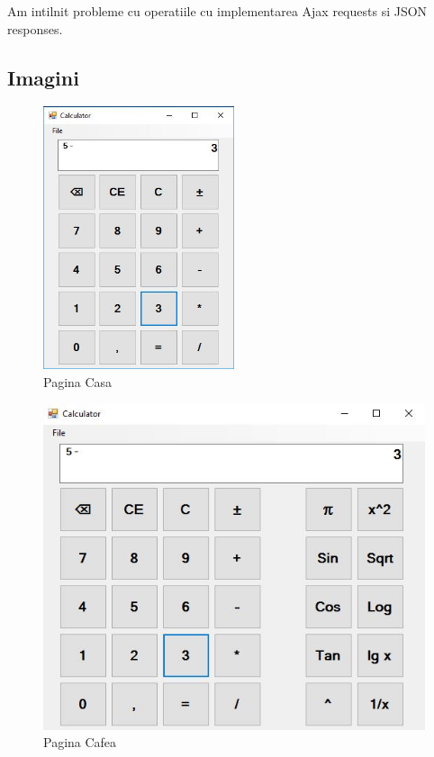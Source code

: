 Am intilnit probleme cu operatiile cu implementarea Ajax requests si JSON responses.  
 



\subsection{Imagini}




\begin{figure}[!ht]
	
	\centering
	
	\includegraphics[width=0.5\textwidth]{Cattura.JPG}
	
	\caption{Pagina Casa}
	
	\label{Im_label}
	
\end{figure}

\begin{figure}[!ht]
	
	\centering
	
	\includegraphics[width=1.0\textwidth]{Cattura1.JPG}
	
	\caption{Pagina Cafea}
	
	\label{Im_label}
	
\end{figure}

